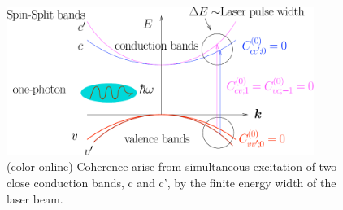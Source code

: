 \documentclass[floatfix,prb,aps,superscriptaddress,11pt]{revtex4}
\begin{document}
\begin{figure}[t]
\includegraphics[width=10cm]{bands2-tmk}
\caption{(color online)
Coherence arise from simultaneous excitation of two close conduction bands, 
c and c', by the ﬁnite energy width of the laser beam. 
}
\label{fig:CoherenceBands}
\end{figure}
\end{document}
